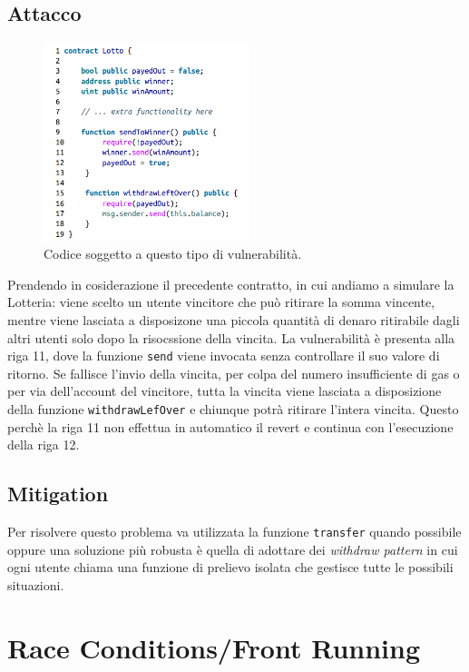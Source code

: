 \subsection{Attacco}

\begin{figure}[H]
      \centering
      \includegraphics[width=6cm, keepaspectratio]{capitoli/ethereum/imgs/unchecked_call.png}
      \caption{Codice soggetto a questo tipo di vulnerabilità.}
\end{figure}

Prendendo in cosiderazione il precedente contratto, in cui andiamo a simulare
la Lotteria: viene scelto un utente vincitore che può ritirare la somma vincente,
mentre viene lasciata a disposizone una piccola quantità di denaro ritirabile
dagli altri utenti solo dopo la risocssione della vincita.
La vulnerabilità è presenta alla riga 11, dove la funzione \verb|send| viene
invocata senza controllare il suo valore di ritorno. Se fallisce l'invio della
vincita, per colpa del numero insufficiente di gas o per via dell'account del
vincitore, tutta la vincita viene lasciata a disposizione della funzione
\verb|withdrawLefOver| e chiunque potrà ritirare l'intera vincita.
Questo perchè la riga 11 non effettua in automatico il revert e continua
con l'esecuzione della riga 12.

\subsection{Mitigation}

Per risolvere questo problema va utilizzata la funzione \verb|transfer|
quando possibile oppure una soluzione più robusta è quella di adottare dei
\textit{withdraw pattern} in cui ogni utente chiama una funzione di prelievo
isolata che gestisce tutte le possibili situazioni.

\section{Race Conditions/Front Running}

